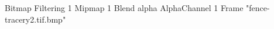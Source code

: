 {Bitmap
	{Filtering 1}
	{Mipmap 1}
	{Blend alpha}
	{AlphaChannel 1}
	{Frame "fence-tracery2.tif.bmp"}
}
